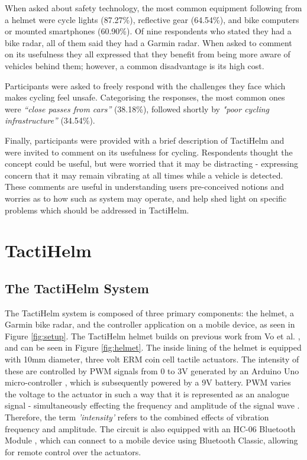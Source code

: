 \documentclass{mpaper}
\begin{document}
When asked about safety technology, the most common equipment following from a helmet were cycle lights (87.27\%), reflective gear (64.54\%), and bike computers or mounted smartphones (60.90\%). Of nine respondents who stated they had a bike radar, all of them said they had a Garmin radar. When asked to comment on its usefulness they all expressed that they benefit from being more aware of vehicles behind them; however, a common disadvantage is its high cost.

Participants were asked to freely respond with the challenges they face which makes cycling feel unsafe. Categorising the responses, the most common ones were \textit{“close passes from cars”} (38.18\%), followed shortly by \textit{"poor cycling infrastructure”} (34.54\%).

Finally, participants were provided with a brief description of TactiHelm and were invited to comment on its usefulness for cycling. Respondents thought the concept could be useful, but were worried that it may be distracting - expressing concern that it may remain vibrating at all times while a vehicle is detected. These comments are useful in understanding users pre-conceived notions and worries as to how such as system may operate, and help shed light on specific problems which should be addressed in TactiHelm.


\section{TactiHelm}
\subsection{The TactiHelm System}\label{sec:tactihelm-system}
The TactiHelm system is composed of three primary components: the helmet, a Garmin bike radar, and the controller application on a mobile device, as seen in Figure \ref{fig:setup}. The TactiHelm helmet builds on previous work from Vo et al. \cite{10.1145/3411763.3451580}, and can be seen in Figure \ref{fig:helmet}. The inside lining of the helmet is equipped with 10mm diameter, three volt ERM coin cell tactile actuators. The intensity of these are controlled by PWM signals from 0 to 3V generated by an Arduino Uno micro-controller \cite{arduinouno}, which is subsequently powered by a 9V battery. PWM varies the voltage to the actuator in such a way that it is represented as an analogue signal - simultaneously effecting the frequency and amplitude of the signal wave \cite{kart2001pulse}. Therefore, the term \textit{'intensity'} refers to the combined effects of vibration frequency and amplitude. The circuit is also equipped with an HC-06 Bluetooth Module \cite{hc06}, which can connect to a mobile device using Bluetooth Classic, allowing for remote control over the actuators.
\end{document}

